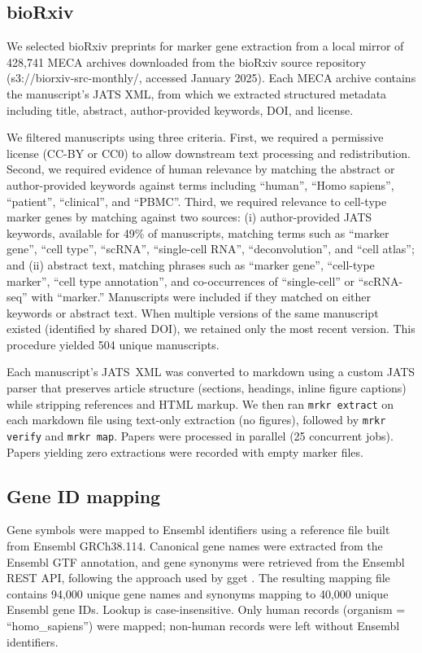 \documentclass[10pt,twocolumn]{article}
\theoremstyle{plain}
\theoremstyle{definition}
\theoremstyle{remark}
\begin{document}
\subsection{bioRxiv}

We selected bioRxiv preprints for marker gene extraction from a local mirror of 428,741 MECA archives downloaded from the bioRxiv source repository (s3://biorxiv-src-monthly/, accessed January 2025). Each MECA archive contains the manuscript's JATS XML, from which we extracted structured metadata including title, abstract, author-provided keywords, DOI, and license.

We filtered manuscripts using three criteria. First, we required a permissive license (CC-BY or CC0) to allow downstream text processing and redistribution. Second, we required evidence of human relevance by matching the abstract or author-provided keywords against terms including ``human'', ``Homo sapiens'', ``patient'', ``clinical'', and ``PBMC''. Third, we required relevance to cell-type marker genes by matching against two sources: (i) author-provided JATS keywords, available for 49\% of manuscripts, matching terms such as ``marker gene'', ``cell type'', ``scRNA'', ``single-cell RNA'', ``deconvolution'', and ``cell atlas''; and (ii) abstract text, matching phrases such as ``marker gene'', ``cell-type marker'', ``cell type annotation'', and co-occurrences of ``single-cell'' or ``scRNA-seq'' with ``marker.'' Manuscripts were included if they matched on either keywords or abstract text. When multiple versions of the same manuscript existed (identified by shared DOI), we retained only the most recent version. This procedure yielded 504 unique manuscripts.

Each manuscript's JATS~XML was converted to markdown using a custom JATS parser that preserves article structure (sections, headings, inline figure captions) while stripping references and HTML markup. We then ran \texttt{mrkr extract} on each markdown file using text-only extraction (no figures), followed by \texttt{mrkr verify} and \texttt{mrkr map}. Papers were processed in parallel (25 concurrent jobs). Papers yielding zero extractions were recorded with empty marker files.

\subsection{Gene ID mapping}

Gene symbols were mapped to Ensembl identifiers using a reference file built from Ensembl GRCh38.114. Canonical gene names were extracted from the Ensembl GTF annotation, and gene synonyms were retrieved from the Ensembl REST API, following the approach used by gget \citep{Luebbert2023}. The resulting mapping file contains 94{,}000 unique gene names and synonyms mapping to 40{,}000 unique Ensembl gene IDs. Lookup is case-insensitive. Only human records (organism = ``homo\_sapiens'') were mapped; non-human records were left without Ensembl identifiers.
\end{document}
